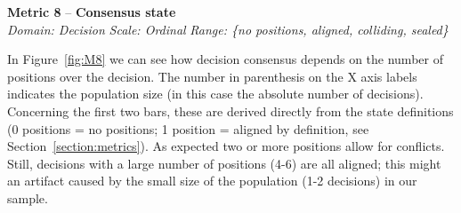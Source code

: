 \documentclass[article]{elsarticle}
\begin{document}
\vspace{1em} 
\noindent
\textbf{Metric 8} -- \textbf{Consensus state}\\
\emph{Domain: Decision} \emph{Scale: Ordinal} \emph{Range: \{no positions, aligned, colliding, sealed\}}

In Figure~\ref{fig:M8} we can see how decision consensus depends on the number of positions over the decision. The number in parenthesis on the X axis labels indicates the population size (in this case the absolute number of decisions).  Concerning the first two bars, these are derived directly from the state definitions (0 positions = no positions; 1 position = aligned by definition, see Section~\ref{section:metrics}). As expected two or more positions allow for conflicts. Still, decisions with a large number of positions (4-6) are all aligned; this might an artifact caused by the small size of the population (1-2 decisions) in our sample. 
\end{document}
